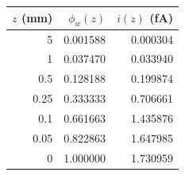 \begin{tabular}{rrr}
\toprule
$z$ (mm) & $\phi_w(z)$ & $i(z)$ (fA) \\
\midrule
5 & 0.001588 & 0.000304 \\
1 & 0.037470 & 0.033940 \\
0.5 & 0.128188 & 0.199874 \\
0.25 & 0.333333 & 0.706661 \\
0.1 & 0.661663 & 1.435876 \\
0.05 & 0.822863 & 1.647985 \\
0 & 1.000000 & 1.730959 \\
\bottomrule
\end{tabular}

